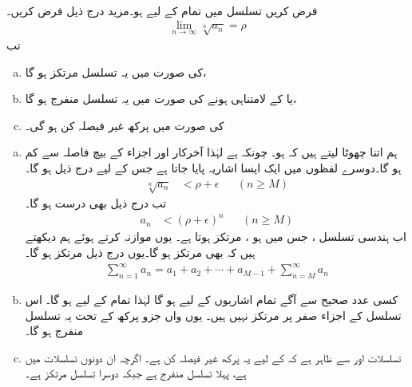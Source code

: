 \\
فرض کریں تسلسل  میں تمام  کے لیے  ہو۔مزید درج ذیل فرض کریں۔
\begin{align*}
\lim_{n\to\infty}\sqrt[n]{a_n}=\rho
\end{align*}
تب
\begin{enumerate}[a.]
\item
{} کی صورت میں یہ تسلسل مرتکز ہو گا،
\item
{} یا     کے  لامتناہی ہونے کی صورت میں یہ تسلسل منفرج ہو گا،
\item
{} کی صورت میں پرکھ غیر فیصلہ کن ہو گی۔
\end{enumerate}
\begin{enumerate}[a.]
\item
{}
\quad
ہم  اتنا چھوٹا لیتے ہیں کہ  ہو۔ چونکہ  ہے لہٰذا آخرکار  اور اجزاء  کے بیچ  فاصلہ  سے کم ہو گا۔دوسرے لفظوں میں ایک ایسا اشاریہ  پایا جاتا ہے جس کے لیے درج ذیل ہو گا۔
\begin{align*}
\sqrt[n]{a_n}&<\rho+\epsilon&& (n\ge M)
\end{align*}
تب درج ذیل بھی درست ہو گا۔
\begin{align*}
a_n&<(\rho+\epsilon)^n&&(n\ge M)
\end{align*}
اب   ہندسی تسلسل  ، جس  میں  ہو ، مرتکز ہوتا ہے۔ یوں موازنہ کرتے ہوئے ہم دیکھتے ہیں کہ  بھی مرتکز ہو گا۔یوں درج ذیل مرتکز ہو گا۔
\begin{align*}
\sum_{n=1}^{\infty}a_n=a_1+a_2+\cdots+a_{M-1}+\sum_{n=M}^{\infty}a_n
\end{align*}
\item
{}
\quad
کسی عدد صحیح  سے آگے تمام اشاریوں  کے لیے   ہو گا لہٰذا تمام  کے لیے  ہو گا۔ اس تسلسل کے اجزاء صفر پر مرتکز نہیں ہیں۔ یوں  واں جزو پرکھ کے تحت یہ تسلسل منفرج ہو گا۔
\item
{}
\quad
تسلسلات   اور  سے ظاہر ہے کہ  کے لیے یہ پرکھ غیر فیصلہ کن ہے۔ اگرچہ ان دونوں تسلسلات  میں  ہے،   پہلا تسلسل منفرج ہے  جبکہ دوسرا تسلسل مرتکز ہے۔
\end{enumerate}

